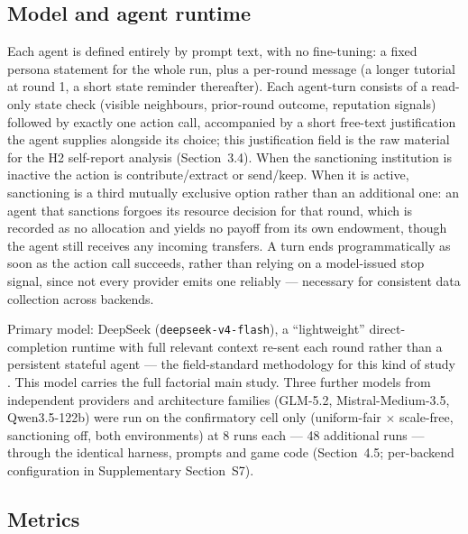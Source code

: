 \documentclass[11pt,a4paper]{article}
\begin{document}
\subsection{Model and agent runtime}

Each agent is defined entirely by prompt text, with no fine-tuning: a
fixed persona statement for the whole run, plus a per-round message
(a longer tutorial at round 1, a short state reminder thereafter).
Each agent-turn consists of a read-only state check (visible
neighbours, prior-round outcome, reputation signals) followed by
exactly one action call, accompanied by a short free-text
justification the agent supplies alongside its choice; this
justification field is the raw material for the H2 self-report
analysis (Section~3.4). When the sanctioning institution is inactive
the action is contribute/extract or send/keep. When it is active,
sanctioning is a third mutually exclusive option rather than an
additional one: an agent that sanctions forgoes its resource decision
for that round, which is recorded as no allocation and yields no
payoff from its own endowment, though the agent still receives any
incoming transfers. A turn ends programmatically as soon as the
action call succeeds, rather than relying on a model-issued stop
signal, since not every provider emits one reliably --- necessary for
consistent data collection across backends.

Primary model: DeepSeek (\texttt{deepseek-v4-flash}), a
``lightweight'' direct-completion runtime with full relevant context
re-sent each round rather than a persistent stateful agent --- the
field-standard methodology for this kind of study
\citep{Han:2025:Static,Qiu:2025:NetworkGames}. This model carries the full
factorial main study. Three further models from independent providers
and architecture families (GLM-5.2, Mistral-Medium-3.5, Qwen3.5-122b) were
run on the confirmatory cell only (uniform-fair $\times$ scale-free,
sanctioning off, both environments) at 8 runs each --- 48 additional
runs --- through the identical harness, prompts and game code
(Section~4.5; per-backend configuration in Supplementary
Section~S7).

\subsection{Metrics}
\end{document}
